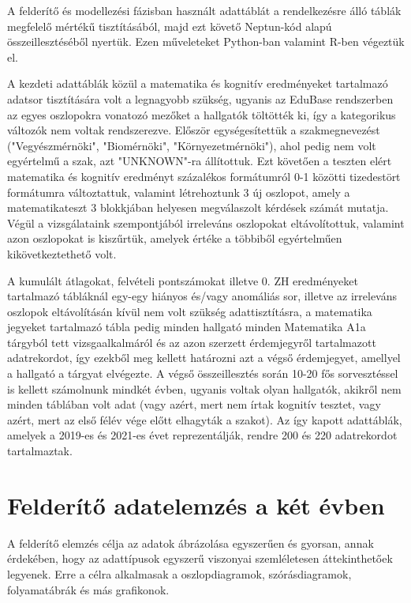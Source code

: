 \documentclass[12pt]{article}
\begin{document}
A felderítő és modellezési fázisban használt adattáblát a rendelkezésre álló táblák megfelelő mértékű tisztításából, majd ezt követő Neptun-kód alapú összeillesztéséből nyertük. Ezen műveleteket Python-ban valamint R-ben végeztük el.

A kezdeti adattáblák közül a matematika és kognitív eredményeket tartalmazó adatsor tisztítására volt a legnagyobb szükség, ugyanis az EduBase rendszerben az egyes oszlopokra vonatozó mezőket a hallgatók töltötték ki, így a kategorikus változók nem voltak rendszerezve. Először egységesítettük a szakmegnevezést ("Vegyészmérnöki", "Biomérnöki", "Környezetmérnöki"), ahol pedig nem volt egyértelmű a szak, azt "UNKNOWN"-ra állítottuk. Ezt követően a teszten elért matematika és kognitív eredményt százalékos formátumról 0-1 közötti tizedestört formátumra változtattuk, valamint létrehoztunk 3 új oszlopot, amely a matematikateszt 3 blokkjában helyesen megválaszolt kérdések számát mutatja. Végül a vizsgálataink szempontjából irreleváns oszlopokat eltávolítottuk, valamint azon oszlopokat is kiszűrtük, amelyek értéke a többiből egyértelműen kikövetkeztethető volt. 

A kumulált átlagokat, felvételi pontszámokat illetve 0. ZH eredményeket tartalmazó tábláknál egy-egy hiányos és/vagy anomáliás sor, illetve az irreleváns oszlopok eltávolításán kívül nem volt szükség adattisztításra, a matematika jegyeket tartalmazó tábla pedig minden hallgató minden Matematika A1a tárgyból tett vizsgaalkalmáról és az azon szerzett érdemjegyről tartalmazott adatrekordot, így ezekből meg kellett határozni azt a végső érdemjegyet, amellyel a hallgató a tárgyat elvégezte. A végső összeillesztés során 10-20 fős sorvesztéssel is kellett számolnunk mindkét évben, ugyanis voltak olyan hallgatók, akikről nem minden táblában volt adat (vagy azért, mert nem írtak kognitív tesztet, vagy azért, mert az első félév vége előtt elhagyták a szakot). Az így kapott adattáblák, amelyek a 2019-es és 2021-es évet reprezentálják, rendre 200 és 220 adatrekordot tartalmaztak.


\section{Felderítő adatelemzés a két évben}

A felderítő elemzés célja az adatok ábrázolása egyszerűen és gyorsan, annak érdekében, hogy az adattípusok egyszerű viszonyai szemléletesen áttekinthetőek legyenek. Erre a célra alkalmasak a oszlopdiagramok, szórásdiagramok, folyamatábrák és más grafikonok.
\end{document}
